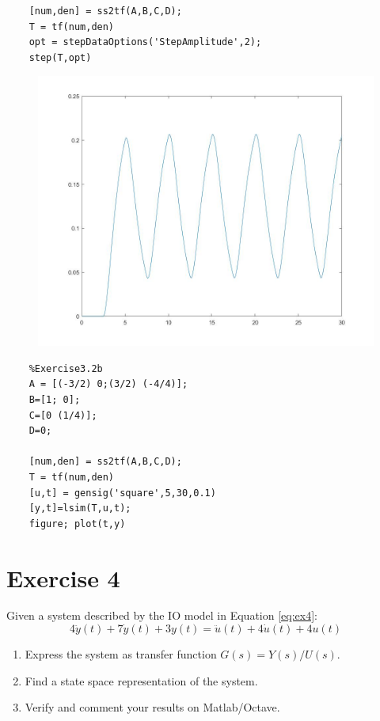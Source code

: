 \documentclass[a4paper,11pt]{article}
\begin{document}
\begin{enumerate}
\begin{lstlisting}
	[num,den] = ss2tf(A,B,C,D);
	T = tf(num,den)
	opt = stepDataOptions('StepAmplitude',2);
	step(T,opt)
	\end{lstlisting}
	\begin{figure}[!h]  \includegraphics [scale=0.4] {Figures/e32square} \end{figure}
	\begin{lstlisting}
	%Exercise3.2b
	A = [(-3/2) 0;(3/2) (-4/4)];
	B=[1; 0];
	C=[0 (1/4)];
	D=0;
	
	[num,den] = ss2tf(A,B,C,D);
	T = tf(num,den)
	[u,t] = gensig('square',5,30,0.1)
	[y,t]=lsim(T,u,t);
	figure; plot(t,y)
	\end{lstlisting}
\end{enumerate}
\vskip0.5cm
\section*{Exercise 4} 
Given a system described by the IO model in Equation \ref{eq:ex4}:
\begin{equation}
4\ddot{y}(t)+ 7\dot{y}(t)+3y(t)=\ddot{u}(t)+4\dot{u}(t)+4u(t)
\label{eq:ex4}
\end{equation}

\begin{enumerate}
\item Express the system as transfer function $G(s)=Y(s)/U(s)$.
\item Find a state space representation of the system.
\item Verify and comment your results on Matlab/Octave. 
\end{enumerate}
\end{document}
